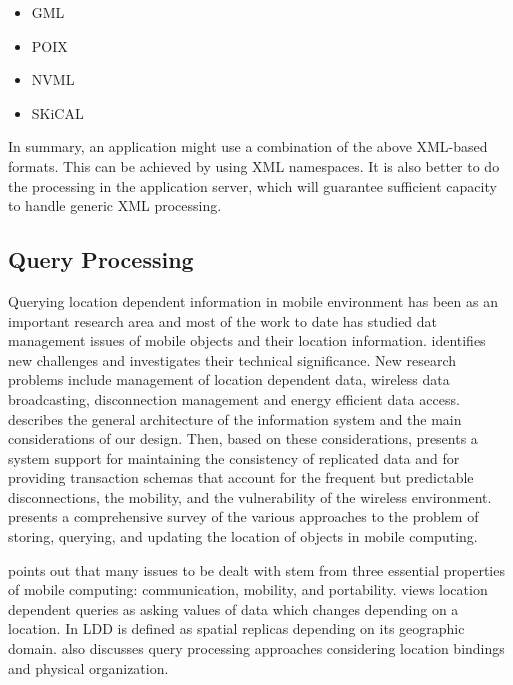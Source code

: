 \documentclass[12pt,a4paper]{article}
\begin{document}
\begin{itemize}
	\item GML \cite{gml}
	\item POIX \cite{poix}
	\item NVML \cite{nvml}
	\item SKiCAL \cite{SKICal}
\end{itemize}

In summary, an application might use a combination of the above XML-based formats. This can be achieved by using XML namespaces. It is also better to do the processing in the application server, which will guarantee sufficient capacity to handle generic XML processing.

\subsection{Query Processing} %
\label{sub:query_processing}
Querying location dependent information in mobile environment has been as an important research area and most of the work to date has studied dat management issues of mobile objects and their location information. \cite{imielinski1993data} identifies new challenges and investigates their technical significance. New research problems include management of location dependent data, wireless data broadcasting, disconnection management and energy efficient data access. \cite{pitoura1994building} describes the general architecture of the information system and the main considerations of our design. Then, based on these considerations, \cite{pitoura1994building} presents a system support for maintaining the consistency of replicated data and for providing transaction schemas that account for the frequent but predictable disconnections, the mobility, and the vulnerability of the wireless environment. \cite{pitoura2001locating} presents a comprehensive survey of the various approaches to the problem of storing, querying, and updating the location of objects in mobile computing.

\cite{forman1994challenges} points out that many issues to be dealt with stem from three essential properties of mobile computing: communication, mobility, and portability. \cite{Dunham:1995:MCD:219713.219727} views location dependent queries as asking values of data which changes depending on a location. In \cite{Dunham:1998ci} LDD is defined as spatial replicas depending on its geographic domain. \cite{kumar1998defining} also discusses query processing approaches considering location bindings and physical organization.
\end{document}
